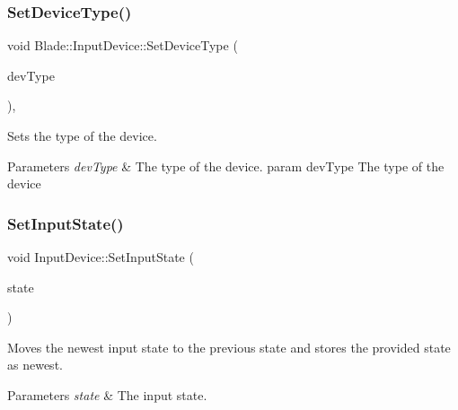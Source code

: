 \subsubsection{\texorpdfstring{Set\+Device\+Type()}{SetDeviceType()}}
{\footnotesize\ttfamily void Blade\+::\+Input\+Device\+::\+Set\+Device\+Type (\begin{DoxyParamCaption}\item[{Device\+Type}]{dev\+Type }\end{DoxyParamCaption})\hspace{0.3cm}{\ttfamily [inline]}, {\ttfamily [protected]}}



Sets the type of the device. 


\begin{DoxyParams}{Parameters}
{\em dev\+Type} & The type of the device. param dev\+Type The type of the device \\
\hline
\end{DoxyParams}
\mbox{\label{class_blade_1_1_input_device_a7e01bfa10e141d916b4459051a08b645}} 
\subsubsection{\texorpdfstring{Set\+Input\+State()}{SetInputState()}}
{\footnotesize\ttfamily void Input\+Device\+::\+Set\+Input\+State (\begin{DoxyParamCaption}\item[{const \hyperlink{struct_blade_1_1_input_state}{Input\+State} \&}]{state }\end{DoxyParamCaption})\hspace{0.3cm}{\ttfamily [protected]}}



Moves the newest input state to the previous state and stores the provided state as newest. 


\begin{DoxyParams}{Parameters}
{\em state} & The input state. \\
\hline
\end{DoxyParams}
\mbox{\label{class_blade_1_1_input_device_a49858a83478b83d04f95d746cc6a4b75}} 

